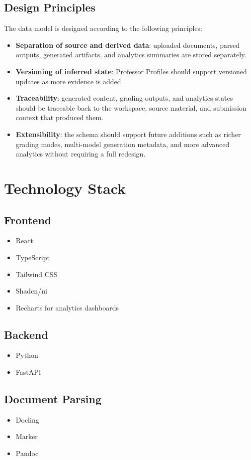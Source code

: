 \documentclass[11pt]{article}
\begin{document}
\subsection{Design Principles}
The data model is designed according to the following principles:

\begin{itemize}
\item \textbf{Separation of source and derived data}: uploaded documents, parsed outputs, generated artifacts, and analytics summaries are stored separately.
\item \textbf{Versioning of inferred state}: Professor Profiles should support versioned updates as more evidence is added.
\item \textbf{Traceability}: generated content, grading outputs, and analytics states should be traceable back to the workspace, source material, and submission context that produced them.
\item \textbf{Extensibility}: the schema should support future additions such as richer grading modes, multi-model generation metadata, and more advanced analytics without requiring a full redesign.
\end{itemize}

\section{Technology Stack}

\subsection{Frontend}
\begin{itemize}
\item React
\item TypeScript
\item Tailwind CSS
\item Shadcn/ui
\item Recharts for analytics dashboards
\end{itemize}

\subsection{Backend}
\begin{itemize}
\item Python
\item FastAPI
\end{itemize}

\subsection{Document Parsing}
\begin{itemize}
\item Docling
\item Marker
\item Pandoc
\end{itemize}
\end{document}
